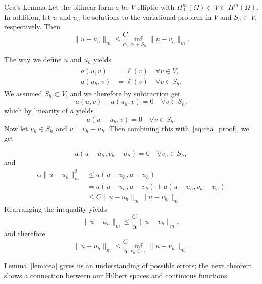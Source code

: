 \begin{lem}{Cea's Lemma\label{lem:cea}}
    Let the bilinear form $a$ be $V$-elliptic with $H_0^m(\Omega)\subset V \subset H^m(\Omega)$. In addition, let $u$ and $u_h$ be solutions to the variational problem in $V$ and $S_h\subset V$, respectively. Then
    \begin{equation}
        \label{eq:cea}
        \|u-u_h\|_m\leq \frac{C}{\alpha}\inf_{v_h\in S_h} \|u-v_h\|_m.
    \end{equation}
    
\end{lem}
\begin{bev}
    The way we define $u$ and $u_h$ yields
    \begin{align}
    \begin{split}
        a(u,v)&= \ell(v) \quad \forall v\in V,\\
        a(u_h,v)&=\ell(v) \quad \forall v\in S_h.
    \end{split}
    \end{align}
    We assumed $S_h\subset V$, and we therefore by subtraction get
    \begin{equation}
        a(u,v)-a(u_h,v)=0 \quad \forall v\in S_h.
    \end{equation}
    which by linearity of $a$ yields
    \begin{equation}
        \label{eq:cea_proof}
        a(u-u_h,v)=0 \quad \forall v\in S_h.
    \end{equation}
    Now let $v_h\in S_h$ and $v=v_h-u_h$. Then combining this with~\eqref{eq:cea_proof}, we get  

    \begin{equation}
        a(u-u_h,v_h-u_h)=0 \quad \forall v_h\in S_h,
    \end{equation}
    and
    \begin{align*}
        \alpha\|u-u_h\|_m^2&\leq a(u-u_h,u-u_h)\\
        &=a(u-u_h,u-v_h)+a(u-u_h,v_h-u_h)\\ 
        &\leq C\|u-u_h\|_m\|u-v_h\|_m.
    \end{align*}
    Rearranging the inequality yields 
    \begin{equation}
        \|u-u_h\|_m\leq \frac{C}{\alpha} \|u-v_h\|_m,
    \end{equation} 
    and therefore
    \begin{equation}
        \|u-u_h\|_m\leq \frac{C}{\alpha}\inf_{v_h\in s_h} \|u-v_h\|_m.
    \end{equation}
\end{bev}
Lemma~\ref{lem:cea} gives us an understanding of possible errors; the next 
theorem shows a connection between our Hilbert spaces and continious 
functions.